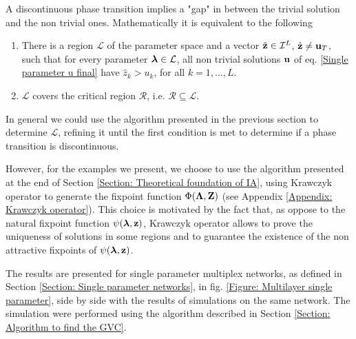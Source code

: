 \documentclass[
11pt, %
american, %
singlespacing, %
final, %
nolistspacing, %
liststotoc, %
headsepline, %
]{MastersDoctoralThesis} %
\begin{document}
A discontinuous phase transition implies a "gap" in between the trivial solution and the non trivial ones. Mathematically it is equivalent to the following
\begin{enumerate}
	\item There is a region $\mathcal{L}$ of the parameter space and a vector $\hat{\boldsymbol{\mathrm{z}}} \in \mathcal{I}^L$, $\hat{\boldsymbol{\mathrm{z}}} \neq \boldsymbol{\mathrm{u}}_T$, such that for every parameter $\boldsymbol{\mathrm{\lambda}} \in \mathcal{L}$, all non trivial solutions $\boldsymbol{\mathrm{u}}$ of eq. \eqref{Single parameter u final} have $\hat{z}_k > u_k$, for all $k = 1, \dots, L$.
	\item $\mathcal{L}$ covers the critical region $\mathcal{R}$, i.e. $\mathcal{R} \subseteq \mathcal{L}$.
\end{enumerate}
In general we could use the algorithm presented in the previous section to determine $\mathcal{L}$, refining it until the first condition is met to determine if a phase transition is discontinuous.

However, for the examples we present, we choose to use the algorithm presented at the end of Section \ref{Section: Theoretical foundation of IA}, using Krawczyk operator to generate the fixpoint function $\Phi(\boldsymbol{\mathrm{\Lambda}}, \boldsymbol{\mathrm{Z}})$ (see Appendix \ref{Appendix: Krawczyk operator}). This choice is motivated by the fact that, as oppose to the natural fixpoint function $\psi(\boldsymbol{\mathrm{\lambda}}, \boldsymbol{\mathrm{z}})$, Krawczyk operator allows to prove the uniqueness of solutions in some regions and to guarantee the existence of the non attractive fixpoints of $\psi(\boldsymbol{\mathrm{\lambda}}, \boldsymbol{\mathrm{z}})$.

The results are presented for single parameter multiplex networks, as defined in Section \ref{Section: Single parameter networks}, in fig. \ref{Figure: Multilayer single parameter}, side by side with the results of simulations on the same network. The simulation were performed using the algorithm described in Section \ref{Section: Algorithm to find the GVC}.
\end{document}
